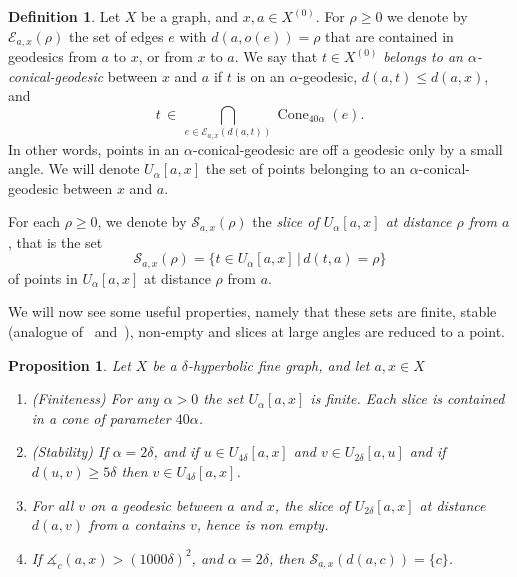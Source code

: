 \documentclass[11pt]{article}
\newtheorem{prop}[theo]{Proposition}
\theoremstyle{definition}
\newtheorem{defi}[theo]{Definition}
\numberwithin{equation}{section}
\DeclareMathOperator{\Co}{Cone}
\newcommand{\A}{\measuredangle}
\begin{document}
\goodbreak
\begin{defi}\label{defi;slice}
Let $X$ be a graph, and $x,a\in X^{(0)}$. For $\rho\geq 0$ we denote by $\mathcal{E}_{a,x} (\rho)$ the set of edges $e$ with $d(a,o(e)) = \rho$ that are contained in geodesics from $a$ to $x$, or from $x$ to $a$. We say that $t\in X^{(0)}$ \emph{belongs to an $\alpha$-conical-geodesic} between $x$ and $a$ if $t$ is on an $\alpha$-geodesic, $d(a,t)\leq d(a,x)$, and
\[
t\,\in\, \bigcap_{e\in \mathcal{E}_{a,x}(d(a,t)) }
\Co_{40\alpha} (e).
\]
In other words, points in an $\alpha$-conical-geodesic are off a geodesic only by a small angle. We will denote $U_{\alpha}[a,x]$ the set of points belonging to an $\alpha$-conical-geodesic between $x$ and $a$.

For each $\rho\geq 0$, we denote by $\mathcal{S}_{a,x}(\rho)$ the \emph{slice of $U_{\alpha}[a,x]$ at distance $\rho$ from $a$}, that is the set
\[
\mathcal{S}_{a,x}(\rho)=\{t\in U_{\alpha}[a,x]\,|\,d(t,a)=\rho\}
\]
of points in $U_{\alpha}[a,x]$ at distance $\rho$ from $a$.
\end{defi}

We will now see some useful properties, namely that these sets are finite, stable (analogue of~\cite[3.3]{AL} and~\cite[3.4]{AL}), non-empty and slices at large angles are reduced to a point.

\begin{prop}\label{prop;recap}
Let $X$ be a $\delta$-hyperbolic fine graph, and let $a,x \in X$
\begin{enumerate}
\item (Finiteness)\label{lem;slices_are_finite}
For any $\alpha>0$ the set $U_\alpha[a,x]$ is finite. Each slice is contained in a cone of parameter $40\alpha$.
\item (Stability)\label{lem;stab}
If $\alpha =2\delta$, and if $u\in U_{4\delta}[a,x]$ and $v\in U_{2\delta}[a,u]$ and if $d(u,v)\geq 5\delta$ then $v\in U_{4\delta}[a,x]$.
\item\label{lem;slices_are_nonempty}
For all $v$ on a geodesic between $a$ and $x$, the slice of $ U_{2\delta}[a,x]$ at distance $d(a,v)$ from $a$ contains $v$, hence is non empty.
\item\label{lem;un_goulet_de_slice}
If $\A_c(a,x) >(1000\delta)^2$, and $\alpha =2\delta$, then $\mathcal{S}_{a,x} (d(a,c))= \{c\}$.
\end{enumerate}
\end{prop}
\end{document}
